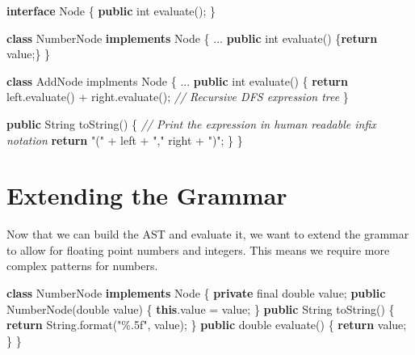 \documentclass[
]{book}
\newenvironment{Shaded}{\begin{snugshade}}{\end{snugshade}}
\newcommand{\BuiltInTok}[1]{#1}
\newcommand{\CommentTok}[1]{\textcolor[rgb]{0.56,0.35,0.01}{\textit{#1}}}
\newcommand{\DataTypeTok}[1]{\textcolor[rgb]{0.13,0.29,0.53}{#1}}
\newcommand{\FunctionTok}[1]{\textcolor[rgb]{0.00,0.00,0.00}{#1}}
\newcommand{\KeywordTok}[1]{\textcolor[rgb]{0.13,0.29,0.53}{\textbf{#1}}}
\newcommand{\NormalTok}[1]{#1}
\newcommand{\SpecialCharTok}[1]{\textcolor[rgb]{0.00,0.00,0.00}{#1}}
\newcommand{\StringTok}[1]{\textcolor[rgb]{0.31,0.60,0.02}{#1}}
\begin{document}
\begin{Shaded}
\begin{Highlighting}[]
\KeywordTok{interface} \BuiltInTok{Node}\NormalTok{ \{}
  \KeywordTok{public} \DataTypeTok{int} \FunctionTok{evaluate}\NormalTok{();}
\NormalTok{\}}

\KeywordTok{class}\NormalTok{ NumberNode }\KeywordTok{implements} \BuiltInTok{Node}\NormalTok{ \{}
\NormalTok{  ...}
  \KeywordTok{public} \DataTypeTok{int} \FunctionTok{evaluate}\NormalTok{() \{}\KeywordTok{return}\NormalTok{ value;\}}
\NormalTok{\}}

\KeywordTok{class}\NormalTok{ AddNode implments }\BuiltInTok{Node}\NormalTok{ \{}
\NormalTok{  ...}
  \KeywordTok{public} \DataTypeTok{int} \FunctionTok{evaluate}\NormalTok{() \{}
    \KeywordTok{return}\NormalTok{ left.}\FunctionTok{evaluate}\NormalTok{() + right.}\FunctionTok{evaluate}\NormalTok{(); }\CommentTok{// Recursive DFS expression tree}
\NormalTok{  \}}
  
  \KeywordTok{public} \BuiltInTok{String} \FunctionTok{toString}\NormalTok{() \{ }\CommentTok{// Print the expression in human readable infix notation}
    \KeywordTok{return} \StringTok{"("}\NormalTok{ + left + }\StringTok{","}\NormalTok{ right + }\StringTok{")"}\NormalTok{;}
\NormalTok{  \}}
\NormalTok{\}}
\end{Highlighting}
\end{Shaded}

\hypertarget{extending-the-grammar}{%
\section{Extending the Grammar}\label{extending-the-grammar}}

Now that we can build the AST and evaluate it, we want to extend the grammar to allow for floating point numbers and integers. This means we require more complex patterns for numbers.

\begin{Shaded}
\begin{Highlighting}[]
\KeywordTok{class}\NormalTok{ NumberNode }\KeywordTok{implements} \BuiltInTok{Node}\NormalTok{ \{}
  \KeywordTok{private} \DataTypeTok{final} \DataTypeTok{double}\NormalTok{ value;}
  \KeywordTok{public} \FunctionTok{NumberNode}\NormalTok{(}\DataTypeTok{double}\NormalTok{ value) \{}
    \KeywordTok{this}\NormalTok{.}\FunctionTok{value}\NormalTok{ = value; }
\NormalTok{  \}}
  \KeywordTok{public} \BuiltInTok{String} \FunctionTok{toString}\NormalTok{() \{}
    \KeywordTok{return} \BuiltInTok{String}\FunctionTok{.format}\NormalTok{(}\StringTok{"}\SpecialCharTok{\%.5f}\StringTok{"}\NormalTok{, value);}
\NormalTok{  \}}
  \KeywordTok{public} \DataTypeTok{double} \FunctionTok{evaluate}\NormalTok{() \{}
    \KeywordTok{return}\NormalTok{ value;}
\NormalTok{  \}}
\NormalTok{\}}
\end{Highlighting}
\end{Shaded}
\end{document}
